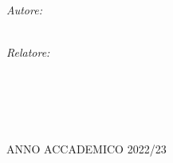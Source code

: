 \begin{titlepage}
\begin{center}
    \begin{minipage}[t]{0.49\textwidth}
    \begin{flushleft} \large
    \emph{Autore:}\\
    \spacedlowsmallcaps{\myName}\\
    \end{flushleft}
    \end{minipage}
    \begin{minipage}[t]{0.49\textwidth}
    \begin{flushright} \large
    \emph{Relatore:} \\
    \\
    \end{flushright}
    \end{minipage}\\[0.5cm]
    \begin{minipage}[t]{0.99\textwidth}
    \begin{flushright} \large
    \end{flushright}
    \end{minipage}\\[3cm]

    \vfill

    ANNO ACCADEMICO 2022/23

  \end{center}
\end{titlepage}
